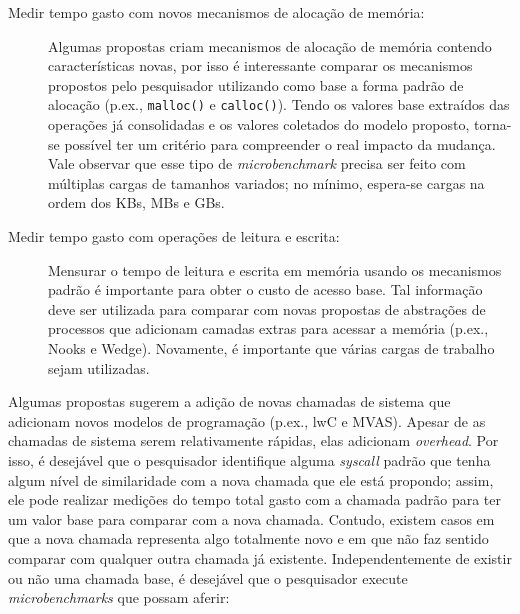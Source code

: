 \begin{description}

  \item[Medir tempo gasto com novos mecanismos de alocação de memória:]

Algumas propostas criam mecanismos de alocação de memória contendo
características novas, por isso é interessante comparar os mecanismos
propostos pelo pesquisador utilizando como base a forma padrão de alocação
(p.ex., \texttt{malloc()} e \texttt{calloc()}). Tendo os valores base extraídos
das operações já consolidadas e os valores coletados do modelo proposto,
torna-se possível ter um critério para compreender o real impacto da mudança.
Vale observar que esse tipo de \emph{microbenchmark} precisa ser feito com
múltiplas cargas de tamanhos variados; no mínimo, espera-se cargas na ordem dos
KBs, MBs e GBs.

  \item[Medir tempo gasto com operações de leitura e escrita:]

Mensurar o tempo de leitura e escrita em memória usando os mecanismos
padrão é importante para obter o custo de acesso base. Tal informação deve ser
utilizada para comparar com novas propostas de abstrações de processos que
adicionam camadas extras para acessar a memória (p.ex., Nooks e Wedge).
Novamente, é importante que várias cargas de trabalho sejam utilizadas.

\end{description}

Algumas propostas sugerem a adição de novas chamadas de sistema que adicionam
novos modelos de programação (p.ex., lwC e MVAS). Apesar de as chamadas de sistema
serem relativamente rápidas, elas adicionam \emph{overhead}. Por isso, é
desejável que o pesquisador identifique alguma \emph{syscall} padrão que tenha
algum nível de similaridade com a nova chamada que ele está propondo; assim, ele
pode realizar medições do tempo total gasto com a chamada padrão para ter um valor
base para comparar com a nova chamada. Contudo, existem casos em que a nova
chamada representa algo totalmente novo e em que não faz sentido comparar com
qualquer outra chamada já existente. Independentemente de existir ou não uma
chamada base, é desejável que o pesquisador execute \emph{microbenchmarks} que
possam aferir:

